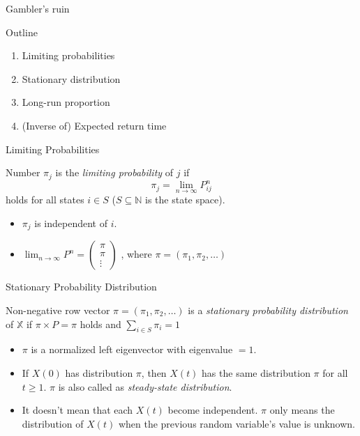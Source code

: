 \documentclass[mathserif]{beamer}
\begin{document}
\begin{frame}{Gambler's ruin}
\end{frame}

\begin{frame}{Outline}
	\begin{enumerate}
		\item Limiting probabilities
		\item Stationary distribution
		\item Long-run proportion
		\item (Inverse of) Expected return time
	\end{enumerate}
\end{frame}

\begin{frame}{Limiting Probabilities}
	\begin{definition}
		Number $\pi_j$ is the \textit{limiting probability} of $j$ if
		\[
		\pi_j = \lim_{n \to \infty} P^n_{ij}
		\]
		holds for all states $i \in S$ ($S \subseteq \mathbb{N}$ is the state space).
	\end{definition}
	\begin{itemize}
		\item $\pi_j$ is independent of $i$.
		\item $\lim_{n \to \infty} P^n = 
			\begin{pmatrix}
				\pi \\
				\pi \\
				\vdots
			\end{pmatrix}$
			, where $\pi = (\pi_1, \pi_2, \ldots)$
	\end{itemize}
\end{frame}

\begin{frame}{Stationary Probability Distribution}
	\begin{definition}
		Non-negative row vector $\pi = (\pi_1, \pi_2, \ldots)$
		is a \textit{stationary probability distribution} of $\mathbb{X}$
		if $\pi \times P = \pi$ holds and $\sum_{i \in S} \pi_i = 1$
	\end{definition}
	\begin{itemize}
		\item $\pi$ is a normalized left eigenvector with eigenvalue $=1$.
		\item If $X(0)$ has distribution $\pi$, then $X(t)$ has the same distribution $\pi$
			for all $t \geq 1$.
			$\pi$ is also called as \textit{steady-state distribution}.
		\item It doesn't mean that each $X(t)$ become independent.
			$\pi$ only means the distribution of $X(t)$ when the previous random variable's value is unknown.
	\end{itemize}
\end{frame}
\end{document}
